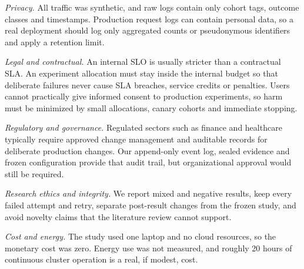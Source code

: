 \documentclass[a4paper,fleqn,11pt]{cas-dc}
\begin{document}
\textit{Privacy.} All traffic was synthetic, and raw logs contain only cohort tags, outcome classes and timestamps. Production request logs can contain personal data, so a real deployment should log only aggregated counts or pseudonymous identifiers and apply a retention limit.

\textit{Legal and contractual.} An internal SLO is usually stricter than a contractual SLA. An experiment allocation must stay inside the internal budget so that deliberate failures never cause SLA breaches, service credits or penalties. Users cannot practically give informed consent to production experiments, so harm must be minimized by small allocations, canary cohorts and immediate stopping.

\textit{Regulatory and governance.} Regulated sectors such as finance and healthcare typically require approved change management and auditable records for deliberate production changes. Our append-only event log, sealed evidence and frozen configuration provide that audit trail, but organizational approval would still be required.

\textit{Research ethics and integrity.} We report mixed and negative results, keep every failed attempt and retry, separate post-result changes from the frozen study, and avoid novelty claims that the literature review cannot support.

\textit{Cost and energy.} The study used one laptop and no cloud resources, so the monetary cost was zero. Energy use was not measured, and roughly 20 hours of continuous cluster operation is a real, if modest, cost.

\end{document}
